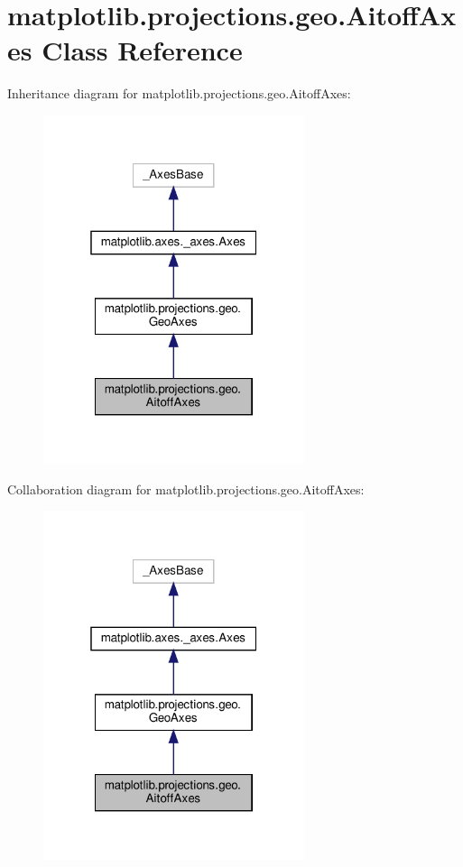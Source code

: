 \hypertarget{classmatplotlib_1_1projections_1_1geo_1_1AitoffAxes}{}\section{matplotlib.\+projections.\+geo.\+Aitoff\+Axes Class Reference}
\label{classmatplotlib_1_1projections_1_1geo_1_1AitoffAxes}


Inheritance diagram for matplotlib.\+projections.\+geo.\+Aitoff\+Axes\+:
\nopagebreak
\begin{figure}[H]
\begin{center}
\leavevmode
\includegraphics[width=217pt]{classmatplotlib_1_1projections_1_1geo_1_1AitoffAxes__inherit__graph}
\end{center}
\end{figure}


Collaboration diagram for matplotlib.\+projections.\+geo.\+Aitoff\+Axes\+:
\nopagebreak
\begin{figure}[H]
\begin{center}
\leavevmode
\includegraphics[width=217pt]{classmatplotlib_1_1projections_1_1geo_1_1AitoffAxes__coll__graph}
\end{center}
\end{figure}
